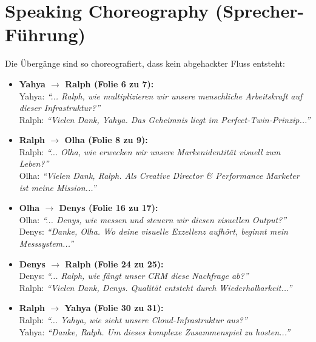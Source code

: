 \documentclass[11pt,a4paper]{article}
\begin{document}
\section{Speaking Choreography (Sprecher-Führung)}
Die Übergänge sind so choreografiert, dass kein abgehackter Fluss entsteht:
\begin{itemize}
    \item \textbf{Yahya $\rightarrow$ Ralph (Folie 6 zu 7):} \\
    Yahya: \textit{``... Ralph, wie multiplizieren wir unsere menschliche Arbeitskraft auf dieser Infrastruktur?''} \\
    Ralph: \textit{``Vielen Dank, Yahya. Das Geheimnis liegt im Perfect-Twin-Prinzip...''}
    
    \item \textbf{Ralph $\rightarrow$ Olha (Folie 8 zu 9):} \\
    Ralph: \textit{``... Olha, wie erwecken wir unsere Markenidentität visuell zum Leben?''} \\
    Olha: \textit{``Vielen Dank, Ralph. Als Creative Director \& Performance Marketer ist meine Mission...''}
    
    \item \textbf{Olha $\rightarrow$ Denys (Folie 16 zu 17):} \\
    Olha: \textit{``... Denys, wie messen und steuern wir diesen visuellen Output?''} \\
    Denys: \textit{``Danke, Olha. Wo deine visuelle Exzellenz aufhört, beginnt mein Messsystem...''}
    
    \item \textbf{Denys $\rightarrow$ Ralph (Folie 24 zu 25):} \\
    Denys: \textit{``... Ralph, wie fängt unser CRM diese Nachfrage ab?''} \\
    Ralph: \textit{``Vielen Dank, Denys. Qualität entsteht durch Wiederholbarkeit...''}
    
    \item \textbf{Ralph $\rightarrow$ Yahya (Folie 30 zu 31):} \\
    Ralph: \textit{``... Yahya, wie sieht unsere Cloud-Infrastruktur aus?''} \\
    Yahya: \textit{``Danke, Ralph. Um dieses komplexe Zusammenspiel zu hosten...''}
\end{itemize}

\newpage
\end{document}
